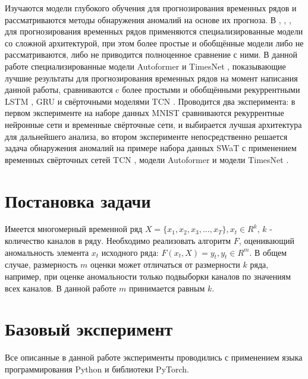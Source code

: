 \documentclass{article}
\begin{document}
Изучаются модели глубокого обучения для прогнозирования временных рядов и рассматриваются методы обнаружения аномалий на основе их прогноза. В \cite{darban2022deep}, \cite{wu2022autoformer}, \cite{wu2023timesnet}, \cite{zeng2022transformers} для прогнозирования временных рядов применяются специализированные модели со сложной архитектурой, при этом более простые и обобщённые модели либо не рассматриваются, либо не приводится полноценное сравнение с ними. В данной работе специализированные модели Autoformer \cite{wu2022autoformer} и TimesNet \cite{wu2023timesnet}, показывающие лучшие результаты для прогнозирования временных рядов \cite{wu2023timesnet} на момент написания данной работы, сравниваются c более простыми и обобщёнными рекуррентными LSTM \cite{staudemeyer2019understanding}, GRU \cite{dey2017gatevariants} и свёрточными моделями TCN \cite{bai2018empirical}. Проводится два эксперимента: в первом эксперименте на наборе данных MNIST сравниваются рекуррентные нейронные сети и временные свёрточные сети, и выбирается лучшая архитектура для дальнейшего анализа, во втором эксперименте непосредственно решается задача обнаружения аномалий на примере набора данных SWaT \cite{Goh2016ADT} с применением временных свёрточных сетей TCN \cite{bai2018empirical}, модели Autoformer \cite{wu2022autoformer} и модели TimesNet \cite{wu2023timesnet}.
\section{Постановка задачи}
\label{sec:headings}

Имеется многомерный временной ряд $X = \{x_1, x_2, x_3, ..., x_T\}, x_t \in R^k$, $k$ - количество каналов в ряду. Необходимо реализовать алгоритм $F$, оценивающий аномальность элемента $x_t$ исходного ряда: $F(x_t, X) = y_t, y_t \in R^m$. В общем случае, размерность $m$ оценки может отличаться от размерности $k$ ряда, например, при оценке аномальности только подвыборки каналов по значениям всех каналов. В данной работе $m$ принимается равным $k$.

\section{Базовый эксперимент}

Все описанные в данной работе эксперименты проводились с применением языка программирования Python и библиотеки PyTorch. 
\end{document}
